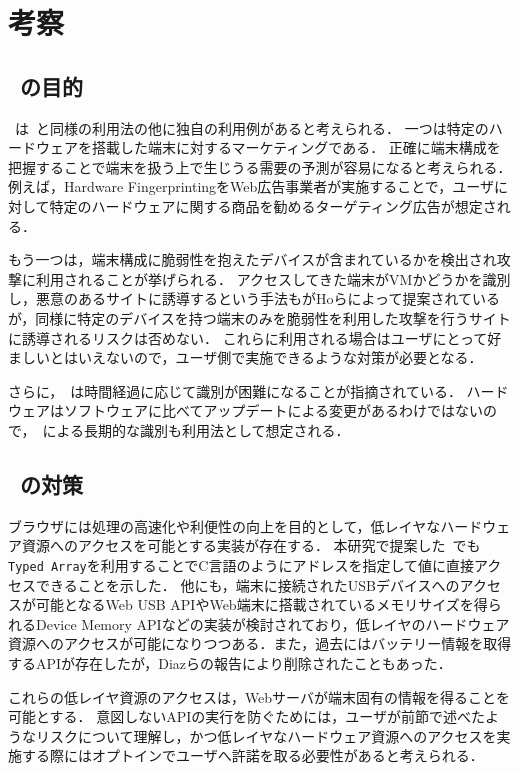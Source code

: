 \newpage
\section{考察}
\subsection{\hfp~の目的}
\hfp~は\fp~と同様の利用法の他に独自の利用例があると考えられる．
一つは特定のハードウェアを搭載した端末に対するマーケティングである．
正確に端末構成を把握することで端末を扱う上で生じうる需要の予測が容易になると考えられる．
例えば，Hardware FingerprintingをWeb広告事業者が実施することで，ユーザに対して特定のハードウェアに関する商品を勧めるターゲティング広告が想定される．

もう一つは，端末構成に脆弱性を抱えたデバイスが含まれているかを検出され攻撃に利用されることが挙げられる．
アクセスしてきた端末がVMかどうかを識別し，悪意のあるサイトに誘導するという手法もがHoら\cite{ho2014tick}によって提案されているが，同様に特定のデバイスを持つ端末のみを脆弱性を利用した攻撃を行うサイトに誘導されるリスクは否めない．
これらに利用される場合はユーザにとって好ましいとはいえないので，ユーザ側で実施できるような対策が必要となる．

さらに，\fp~は時間経過に応じて識別が困難になることが指摘されている\cite{磯侑斗2014web}．
ハードウェアはソフトウェアに比べてアップデートによる変更があるわけではないので，\hfp~による長期的な識別も利用法として想定される．

\subsection{\hfp~の対策}
ブラウザには処理の高速化や利便性の向上を目的として，低レイヤなハードウェア資源へのアクセスを可能とする実装が存在する．
本研究で提案した\hfp~でも\texttt{Typed Array}を利用することでC言語のようにアドレスを指定して値に直接アクセスできることを示した．
他にも，端末に接続されたUSBデバイスへのアクセスが可能となるWeb USB API\cite{webusb}やWeb端末に搭載されているメモリサイズを得られるDevice Memory API\cite{device_memory}などの実装が検討されており，低レイヤのハードウェア資源へのアクセスが可能になりつつある．また，過去にはバッテリー情報を取得するAPIが存在したが，Diazら\cite{diaz2015leaking}の報告により削除されたこともあった．

これらの低レイヤ資源のアクセスは，Webサーバが端末固有の情報を得ることを可能とする．
意図しないAPIの実行を防ぐためには，ユーザが前節で述べたようなリスクについて理解し，かつ低レイヤなハードウェア資源へのアクセスを実施する際にはオプトインでユーザへ許諾を取る必要性があると考えられる．

